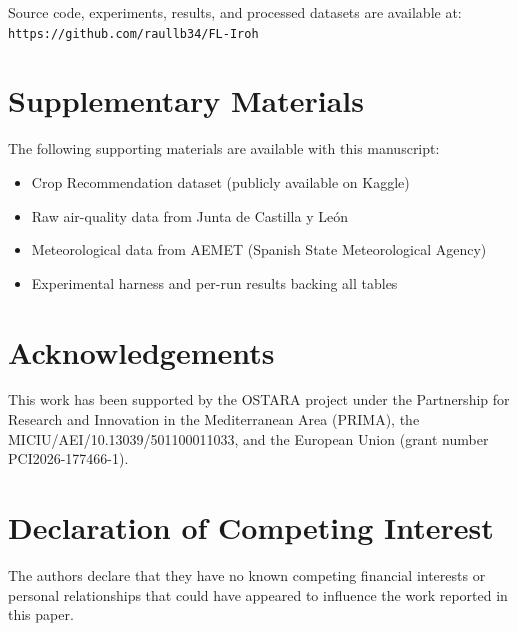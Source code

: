 \documentclass[a4paper,fleqn]{cas-dc}
\begin{document}
Source code, experiments, results, and processed datasets are available at:\\
\texttt{https://github.com/raullb34/FL-Iroh}

\section*{Supplementary Materials}

The following supporting materials are available with this manuscript:
\begin{itemize}
  \item Crop Recommendation dataset (publicly available on Kaggle)
  \item Raw air-quality data from Junta de Castilla y Le\'on
  \item Meteorological data from AEMET (Spanish State Meteorological Agency)
  \item Experimental harness and per-run results backing all tables
\end{itemize}

\section*{Acknowledgements}

This work has been supported by the OSTARA project under the Partnership for Research and Innovation in the Mediterranean Area (PRIMA), the MICIU/AEI/10.13039/501100011033, and the European Union (grant number PCI2026-177466-1).

\section*{Declaration of Competing Interest}

The authors declare that they have no known competing financial interests or personal relationships that could have appeared to influence the work reported in this paper.
\end{document}
